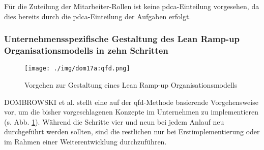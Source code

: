 Für die Zuteilung der Mitarbeiter-Rollen ist keine \gls{pdca}-Einteilung vorgesehen, da dies bereits durch die \gls{pdca}-Einteilung der Aufgaben erfolgt. 


\subsubsection{Unternehmensspezifische Gestaltung des Lean Ramp-up Organisationsmodells in zehn Schritten}\label{sec:zehnschritte}

\begin{figure}[ht]
 \centering
 \texttt{[image: ./img/dom17a:qfd.png]}
 \caption[Vorgehen zur Gestaltung eines Lean Ramp-up Organisationsmodells]{Vorgehen zur Gestaltung eines Lean Ramp-up Organisationsmodells \autocite{Dombrowski2017a}}
 \label{fig:dom17a:qfd}
\end{figure}

DOMBROWSKI et al. stellt eine auf der \gls{qfd}-Methode basierende Vorgehensweise vor, um die bisher vorgeschlagenen Konzepte im Unternehmen zu implementieren (s. Abb. \ref{fig:dom17a:qfd}). 
Während die Schritte vier und neun bei jedem Anlauf neu durchgeführt werden sollten, sind die restlichen nur bei Erstimplementierung oder im Rahmen einer Weiterentwicklung durchzuführen. 

